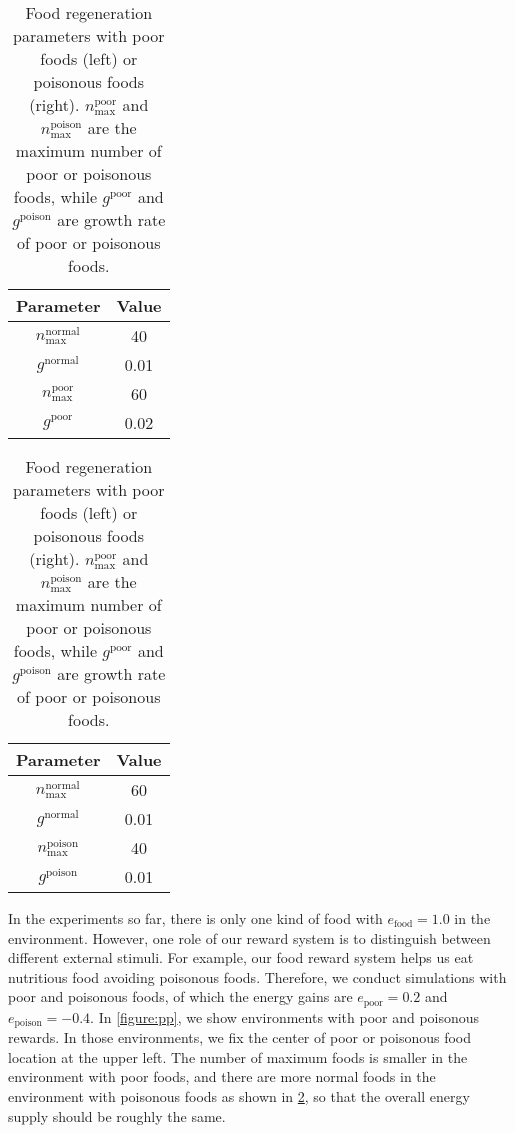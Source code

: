 \begin{table}[t]
  \begin{subtable}[h]{0.45\columnwidth}
    \centering
    \begin{tabular}{cc}
      \toprule
      Parameter & Value \\
      \midrule
      $n_{\textrm{max}}^{\textrm{normal}}$ & 40\\
      $g^{\textrm{normal}}$ & 0.01 \\
      $n_{\textrm{max}}^{\textrm{poor}}$ & 60 \\
      $g^{\textrm{poor}}$ & 0.02 \\
      \bottomrule
    \end{tabular}
  \end{subtable}
  \begin{subtable}[h]{0.45\columnwidth}
    \centering
    \begin{tabular}{cc}
      \toprule
      Parameter & Value \\
      \midrule
      $n_{\textrm{max}}^{\textrm{normal}}$ & 60\\
      $g^{\textrm{normal}}$ & 0.01 \\
      $n_{\textrm{max}}^{\textrm{poison}}$ & 40 \\
      $g^{\textrm{poison}}$ & 0.01 \\
      \bottomrule
    \end{tabular}
  \end{subtable}
  \caption{
    Food regeneration parameters with poor foods (left) or poisonous foods (right).
    $n_{\textrm{max}}^{\textrm{poor}}$ and $n_{\textrm{max}}^{\textrm{poison}}$ are the maximum number of poor or poisonous foods, while $g^{\textrm{poor}}$ and $g^{\textrm{poison}}$ are growth rate of poor or poisonous foods.
  }\label{table:pp}
\end{table}

In the experiments so far, there is only one kind of food with $e_{\mathrm{food}} = 1.0$ in the environment. However, one role of our reward system is to distinguish between different external stimuli. For example, our food reward system helps us eat nutritious food avoiding poisonous foods. Therefore, we conduct simulations with poor and poisonous foods, of which the energy gains are $e_{\mathrm{poor}} = 0.2$ and $e_{\mathrm{poison}} = -0.4$. In \cref{figure:pp}, we show environments with poor and poisonous rewards. In those environments, we fix the center of poor or poisonous food location at the upper left. The number of maximum foods is smaller in the environment with poor foods, and there are more normal foods in the environment with poisonous foods as shown in \cref{table:pp}, so that the overall energy supply should be roughly the same.

